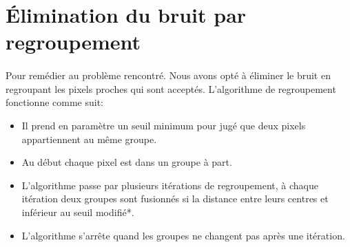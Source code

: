 \documentclass[12pt]{report}
\begin{document}
\section{Élimination du bruit par regroupement}
\paragraph{}Pour remédier au problème rencontré. Nous avons opté à éliminer le bruit en regroupant les pixels proches qui sont acceptés. L’algorithme de regroupement fonctionne comme suit:
\begin{itemize}
	\item Il prend en paramètre un seuil minimum pour jugé que deux pixels appartiennent au même groupe.
	
	\item Au début chaque pixel est dans un groupe à part.
	
	\item L’algorithme passe par plusieurs itérations de regroupement, à chaque itération deux groupes sont fusionnés si la distance entre leurs centres et inférieur au seuil modifié*.
	
	\item L’algorithme s’arrête quand les groupes ne changent pas après une itération.
\end{itemize}
\end{document}
